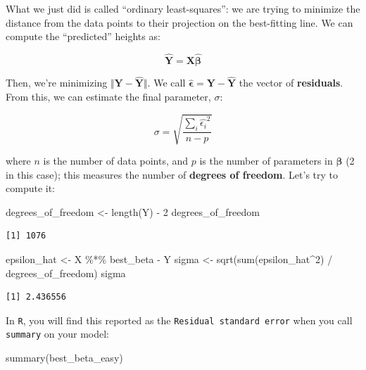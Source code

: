 \documentclass[
  letterpaper,
  DIV=11,
  numbers=noendperiod]{scrreprt}
\newenvironment{Shaded}{\begin{snugshade}}{\end{snugshade}}
\newcommand{\DecValTok}[1]{\textcolor[rgb]{0.68,0.00,0.00}{#1}}
\newcommand{\FunctionTok}[1]{\textcolor[rgb]{0.28,0.35,0.67}{#1}}
\newcommand{\NormalTok}[1]{\textcolor[rgb]{0.00,0.23,0.31}{#1}}
\newcommand{\OtherTok}[1]{\textcolor[rgb]{0.00,0.23,0.31}{#1}}
\newcommand{\SpecialCharTok}[1]{\textcolor[rgb]{0.37,0.37,0.37}{#1}}
\begin{document}
What we just did is called ``ordinary least-squares'': we are trying to
minimize the distance from the data points to their projection on the
best-fitting line. We can compute the ``predicted'' heights as:

\[
\hat{\mathbf{Y}} = \mathbf{X}\hat{\mathbf{\beta}}
\]

Then, we're minimizing \(\Vert \mathbf{Y} - \hat{\mathbf{Y}}\Vert\). We
call \(\hat{\mathbf{\epsilon}} = \mathbf{Y} - \hat{\mathbf{Y}}\) the
vector of \textbf{residuals}. From this, we can estimate the final
parameter, \(\sigma\):

\[
\sigma = \sqrt{\frac{\sum_i \hat{\epsilon_i}^2}{n -  p}}
\]

where \(n\) is the number of data points, and \(p\) is the number of
parameters in \(\mathbf{\beta}\) (2 in this case); this measures the
number of \textbf{degrees of freedom}. Let's try to compute it:

\begin{Shaded}
\begin{Highlighting}[]
\NormalTok{degrees\_of\_freedom }\OtherTok{\textless{}{-}} \FunctionTok{length}\NormalTok{(Y) }\SpecialCharTok{{-}} \DecValTok{2}
\NormalTok{degrees\_of\_freedom}
\end{Highlighting}
\end{Shaded}

\begin{verbatim}
[1] 1076
\end{verbatim}

\begin{Shaded}
\begin{Highlighting}[]
\NormalTok{epsilon\_hat }\OtherTok{\textless{}{-}}\NormalTok{ X }\SpecialCharTok{\%*\%}\NormalTok{ best\_beta }\SpecialCharTok{{-}}\NormalTok{ Y}
\NormalTok{sigma }\OtherTok{\textless{}{-}} \FunctionTok{sqrt}\NormalTok{(}\FunctionTok{sum}\NormalTok{(epsilon\_hat}\SpecialCharTok{\^{}}\DecValTok{2}\NormalTok{) }\SpecialCharTok{/}\NormalTok{ degrees\_of\_freedom)}
\NormalTok{sigma}
\end{Highlighting}
\end{Shaded}

\begin{verbatim}
[1] 2.436556
\end{verbatim}

In \texttt{R}, you will find this reported as the
\texttt{Residual\ standard\ error} when you call \texttt{summary} on
your model:

\begin{Shaded}
\begin{Highlighting}[]
\FunctionTok{summary}\NormalTok{(best\_beta\_easy)}
\end{Highlighting}
\end{Shaded}
\end{document}
